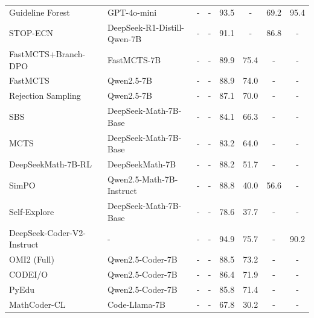\begin{table}[H]
{\begin{tabular}{@{} l|l|cccccc @{}}
Guideline Forest~\cite{chen2025guidelineforest} & GPT-4o-mini~\cite{openai2024gpt4omini} & - & - & 93.5 & - & 69.2 & 95.4 \\
STOP-ECN~\cite{xu2026stop} & DeepSeek-R1-Distill-Qwen-7B~\cite{guo2025deepseek} & - & - & 91.1 & - & 86.8 & - \\
FastMCTS+Branch-DPO~\cite{li2025fastmcts} & FastMCTS-7B & - & - & 89.9 & 75.4 & - & - \\
FastMCTS~\cite{li2025fastmcts} & Qwen2.5-7B~\cite{qwen2024qwen25} & - & - & 88.9 & 74.0 & - & - \\
Rejection Sampling~\cite{li2025fastmcts} & Qwen2.5-7B~\cite{qwen2024qwen25} & - & - & 87.1 & 70.0 & - & - \\
SBS~\cite{chen2024alphamath} & DeepSeek-Math-7B-Base~\cite{shao2024deepseekmath} & - & - & 84.1 & 66.3 & - & - \\
MCTS~\cite{chen2024alphamath} & DeepSeek-Math-7B-Base~\cite{shao2024deepseekmath} & - & - & 83.2 & 64.0 & - & - \\
DeepSeekMath-7B-RL~\cite{shao2024deepseekmath} & DeepSeekMath-7B~\cite{shao2024deepseekmath} & - & - & 88.2 & 51.7 & - & - \\
SimPO~\cite{novasky2025reduceoverthinking} & Qwen2.5-Math-7B-Instruct~\cite{qwen2024qwen25math} & - & - & 88.8 & 40.0 & 56.6 & - \\
Self-Explore~\cite{hwang2024self} & DeepSeek-Math-7B-Base~\cite{shao2024deepseekmath} & - & - & 78.6 & 37.7 & - & - \\
DeepSeek-Coder-V2-Instruct~\cite{deepseek2024coderv2} & - & - & - & 94.9 & 75.7 & - & 90.2 \\
OMI2 (Full)~\cite{li2025codei} & Qwen2.5-Coder-7B~\cite{qwen2024qwen25coder} & - & - & 88.5 & 73.2 & - & - \\
CODEI/O~\cite{li2025codei} & Qwen2.5-Coder-7B~\cite{qwen2024qwen25coder} & - & - & 86.4 & 71.9 & - & - \\
PyEdu~\cite{li2025codei} & Qwen2.5-Coder-7B~\cite{qwen2024qwen25coder} & - & - & 85.8 & 71.4 & - & - \\
MathCoder-CL~\cite{wang2024mathcoder} & Code-Llama-7B~\cite{roziere2023code} & - & - & 67.8 & 30.2 & - & - \\
\bottomrule
\end{tabular}
}
\end{table}
